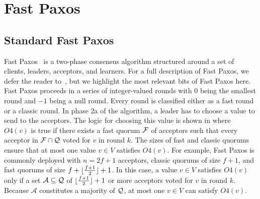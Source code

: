 \section{Fast Paxos}
\subsection{Standard Fast Paxos}
Fast Paxos~\cite{lamport2006fast} is a two-phase consensus algorithm structured
around a set of clients, leaders, acceptors, and learners. For a full
description of Fast Paxos, we defer the reader to~\cite{lamport2006fast}, but
we highlight the most relevant bits of Fast Paxos here. Fast Paxos proceeds in
a series of integer-valued rounds with $0$ being the smallest round and $-1$
being a null round. Every round is classified either as a fast round or a
classic round. In phase 2a of the algorithm, a leader has to choose a value to
send to the acceptors. The logic for choosing this value is shown in
 where $O4(v)$ is true if there exists a fast quorum
$\mathcal{F}$ of acceptors such that every acceptor in $\mathcal{F} \cap
\mathcal{Q}$ voted for $v$ in round $k$. The sizes of fast and classic quorums
ensure that at most one value $v \in V$ satisfies $O4(v)$. For example, Fast
Paxos is commonly deployed with $n = 2f + 1$ acceptors, classic quorums of size
$f + 1$, and fast quorums of size $f + \lfloor\frac{f + 1}{2}\rfloor + 1$. In this case, a value $v
\in V$ satisfies $O4(v)$ only if a set $\mathcal{A} \subseteq \mathcal{Q}$ of
$\lfloor\frac{f + 1}{2}\rfloor + 1$ or more acceptors voted for $v$ in round $k$. Because
$\mathcal{A}$ constitutes a majority of $\mathcal{Q}$, at most one $v \in V$ can
satisfy $O4(v)$.

